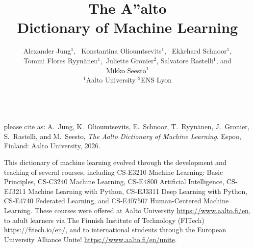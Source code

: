 \documentclass[journal,12pt,onecolumn]{article}
\begin{document}

\title {\vspace*{10mm}
	{\huge {\bf The {\fontsize{40}{48}\selectfont \textbf{\textsf{A\hspace*{-2mm}''}}}\hspace*{-4mm}alto \\ Dictionary of Machine Learning}}  \\[-5mm] 
}


\author{\hspace{-2mm}Alexander Jung${}^{1}$, \ Konstantina Olioumtsevits${}^{1}$, \ 
	Ekkehard Schnoor${}^{1}$, \\[-2mm] Tommi Flores Ryynänen${}^{1}$,\ 
	Juliette Gronier${}^{2}$, Salvatore Rastelli${}^{1}$, and \\[-2mm] Mikko Seesto${}^{1}$ \\[-2mm]
	${}^{1}$Aalto University \quad ${}^{2}$ENS Lyon
}

\maketitle
	\begin{center}
		\\[10mm]
{\large	please cite as: A.\ Jung, K.\ Olioumtsevits, E.\ Schnoor, T.\ Ryynänen, J.\ Gronier, S.\ Rastelli, and M.\ Seesto, \textit{The Aalto Dictionary of Machine Learning}. Espoo, Finland: Aalto University, 2026.}
\end{center}

\newpage 
{} %

\noindent This dictionary of machine learning evolved through the development 
and teaching of several courses, including CS-E3210 Machine Learning: Basic Principles, 
CS-C3240 Machine Learning, CS-E4800 Artificial Intelligence, CS-EJ3211 Machine Learning with Python, 
CS-EJ3311 Deep Learning with Python, CS-E4740 Federated Learning, and 
CS-E407507 Human-Centered Machine Learning. These courses were offered at 
Aalto University \url{https://www.aalto.fi/en}, to adult learners via 
The Finnish Institute of Technology (FITech) \url{https://fitech.io/en/}, and to international 
students through the European University Alliance Unite! \url{https://www.aalto.fi/en/unite}.
\end{document}
